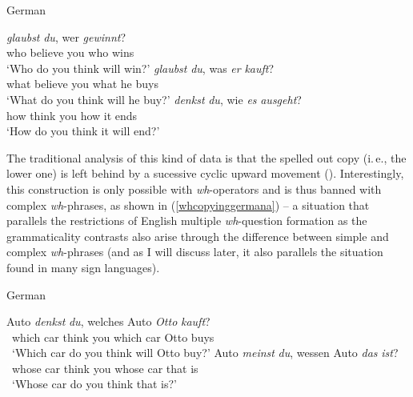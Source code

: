 \begin{exe}
\ex German\label{whcopyinggerman}\begin{xlist}
\ex {} {\textit{glaubst}} {\textit{du},} {wer} {\textit{gewinnt}?} \\
{who} {believe} {you} {who} {wins}\\
\trans `Who do you think will win?' \label{ex:whcopyinggermana}
\ex {} {\textit{glaubst}} {\textit{du},} {was} {\textit{er}} {\textit{kauft}?} \\
{what} {believe} {you} {what} {he} {buys}\\
\trans `What do you think will he buy?' \label{ex:whcopyinggermanb}
\ex {} {\textit{denkst}} {\textit{du},} {wie} {\textit{es}} {\textit{ausgeht}?} \\
{how} {think} {you} {how} {it} {ends}\\
\trans `How do you think it will end?' \label{ex:whcopyinggermanc}
\end{xlist}
\end{exe}

\noindent The traditional analysis of this kind of data is that the spelled out copy (i.\,e., the lower one) is left behind by a sucessive cyclic upward movement (\citealt{mcdaniel1986conditions, fanselow2000towards, hohle2000w, nunes2004linearization, schippers2012some, pankau2013replacing, bayer1984comp, bayer2014}). Interestingly, this construction is only possible with \textit{wh}-operators and is thus banned with complex \textit{wh}-phrases, as shown in (\ref{whcopyinggermana}) -- a situation that parallels the restrictions of English multiple \textit{wh}-question formation as the grammaticality contrasts also arise through the difference between simple and complex \textit{wh}-phrases (and as I will discuss later, it also parallels the situation found in many sign languages).





\begin{exe}
\ex German \label{whcopyinggermana} \begin{xlist}
\ex {} {Auto} {\textit{denkst}} {\textit{du},} {welches} {Auto} {\textit{Otto}} {\textit{kauft}?}   \\
{\textcolor{white}{*}which} {car} {think} {you} {which} {car} {Otto}  {buys}\\
\trans \textcolor{white}{*}`Which car do you think will Otto buy?' \label{ex:whcopyinggermanaa}\ex {}  {Auto}  {\textit{meinst}}  {\textit{du},}  {wessen}  {Auto}  {\textit{das}}  {\textit{ist}?} \\
{\textcolor{white}{*}whose} {car} {think} {you} {whose} {car} {that} {is} \\
\trans \textcolor{white}{*}`Whose car do you think that is?' \label{ex:whcopyinggermanab}
\end{xlist}
\end{exe}

